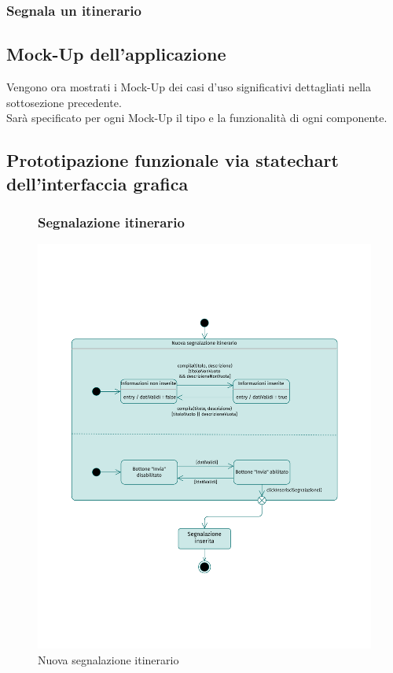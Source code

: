 \documentclass{natourDoc}
\begin{document}
	
	\subsubsection{Segnala un itinerario}


	\newpage
	\subsection{Mock-Up dell'applicazione}
	Vengono ora mostrati i Mock-Up dei casi d'uso significativi dettagliati nella sottosezione precedente.\\
	Sarà specificato per ogni Mock-Up il tipo e la funzionalità di ogni componente.


	\newpage
	\subsection{Prototipazione funzionale via statechart dell'interfaccia grafica}

	\begin{figure}[!htbp]
		\subsubsection{Segnalazione itinerario}
		\centering
		\includegraphics[width=\textwidth, page=1]{./diagrams/statechart.pdf}
		\caption{Nuova segnalazione itinerario}
	\end{figure}
	\FloatBarrier
\end{document}
